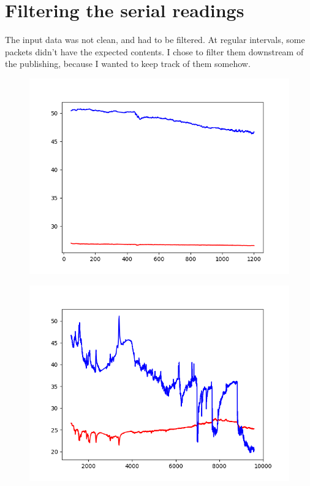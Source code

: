 \documentclass[11pt]{article}
\begin{document}
\section{Filtering the serial readings}
The input data was not clean, and had to be filtered. At regular intervals, some packets didn't have the expected contents. I chose to filter them downstream of the publishing, because I wanted to keep track of them somehow. 

\begin{figure}
\includegraphics[width=\textwidth]{log-201756}
\end{figure}

\begin{figure}
\includegraphics[width=\textwidth]{log-201757}
\end{figure}
\end{document}
